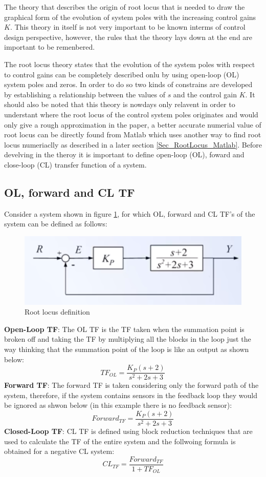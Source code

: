 The theory that describes the origin of root locus that is needed to draw the graphical form of the evolution of system poles with the increasing control gains $K$. This theory in itself is not very important to be known interms of control design perspective, however, the rules that the theory lays down at the end are important to be remenbered. 

The root locus theory states that the evolution of the system poles with respect to control gains can be completely described onlu by using open-loop (OL) system poles and zeros. In order to do so two kinds of constrains are developed by establishing a relationship between the values of $s$ and the control gain $K$. It should also be noted that this theory is nowdays only relavent in order to understant where the root locus of the control system poles originates and would only give a rough approximation in the paper, a better accurate numerial value of root locus can be directly found from Matlab which uses another way to find root locus numeriaclly as described in a later section \ref{Sec_RootLocus_Matlab}. Before develving in the theroy it is important to define open-loop (OL), foward and close-loop (CL) transfer function of a system.

\subsection{OL, forward and CL TF}

Consider a system shown in figure \ref{Fig_OL_forward_CL_TF}, for which OL, forward and CL TF's of the system can be defined as follows:
\begin{figure}[h!]
	\centering
	\includegraphics[width=0.6\linewidth]{Bilder/OL_Forward_CL_TF}
	\caption{Root locus definition}
	\label{Fig_OL_forward_CL_TF}
\end{figure}
\textbf{Open-Loop TF}: The OL TF is the TF taken when the summation point is broken off and taking the TF by multiplying all the blocks in the loop just the way thinking that the summation point of the loop is like an output as shown below:
 \begin{equation}
	TF_{OL} = \frac{K_P (s+2)}{s^2 + 2s + 3}
\end{equation}
\textbf{Forward TF}: The forward TF is taken considering only the forward path of the system, therefore, if the system contains sensors in the feedback loop they would be ignored as shwon below (in this example there is no feedback sensor):
\begin{equation}
	Forward_{TF} = \frac{K_P (s+2)}{s^2 + 2s + 3}
\end{equation}
\textbf{Closed-Loop TF}: CL TF is defined using block reduction techniques that are used to calculate the TF of the entire system and the follwoing formula is obtained for a negative CL system:
\begin{equation}
	CL_{TF} = \frac{Forward_{TF}}{1 + TF_{OL}}
\end{equation}

